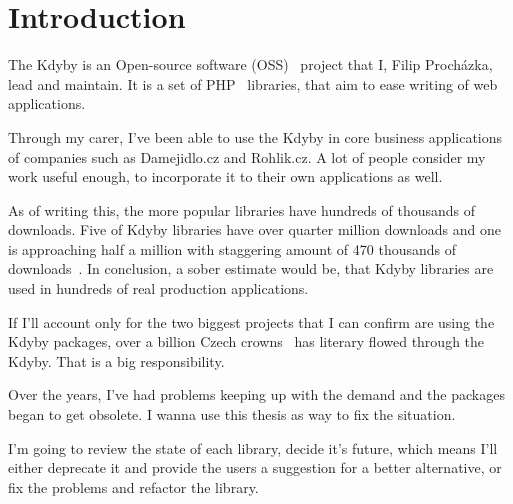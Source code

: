 \chapter{Introduction}

The Kdyby is an Open-source software (OSS)~\cite{wiki:oss} project that I, Filip Procházka, lead and maintain. It is a set of PHP~\cite{wiki:php} libraries, that aim to ease writing of web applications.

Through my carer, I've been able to use the Kdyby in core business applications of companies such as Damejidlo.cz and Rohlik.cz. A lot of people consider my work useful enough, to incorporate it to their own applications as well.

As of writing this, the more popular libraries have hundreds of thousands of downloads. Five of Kdyby libraries have over quarter million downloads and one is approaching half a million with staggering amount of 470 thousands of downloads~\cite{packagist:kdyby}. In conclusion, a sober estimate would be, that Kdyby libraries are used in hundreds of real production applications.

If I'll account only for the two biggest projects that I can confirm are using the Kdyby packages, over a billion Czech crowns~\cite{tyinternety:rohlik-billion} has literary flowed through the Kdyby. That is a big responsibility.

Over the years, I've had problems keeping up with the demand and the packages began to get obsolete. I wanna use this thesis as way to fix the situation.

I'm going to review the state of each library, decide it's future, which means I'll either deprecate it and provide the users a suggestion for a better alternative, or fix the problems and refactor the library.
